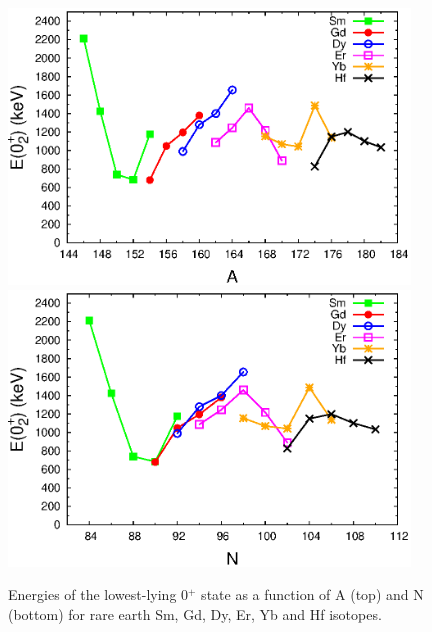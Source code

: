 \begin{figure}[h!]
\begin{center}
\includegraphics[width=0.95\textwidth]{Rare_Earth_0s_energies.eps}\\
\includegraphics[width=0.95\textwidth]{Rare_Earth_0s_N.eps}\\
\end{center}
\caption{Energies of the lowest-lying 0$^+$ state as a function of A (top) and N (bottom) for rare earth Sm, Gd, Dy, Er, Yb and Hf isotopes. \label{fig:Rare_earth_E02}}
\end{figure}

